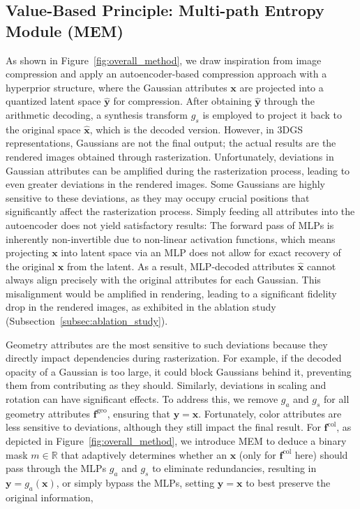 \documentclass{article} %
\begin{document}
\subsection{Value-Based Principle: Multi-path Entropy Module (MEM)}

As shown in Figure~\ref{fig:overall_method}, we draw inspiration from image compression and apply an autoencoder-based compression approach with a hyperprior structure, where the Gaussian attributes $\bm{x}$ are projected into a quantized latent space $\hat{\bm{y}}$ for compression. After obtaining $\hat{\bm{y}}$ through the arithmetic decoding, a synthesis transform $g_s$ is employed to project it back to the original space $\hat{\bm{x}}$, which is the decoded version.
However, in 3DGS representations, Gaussians are not the final output; the actual results are the rendered images obtained through rasterization. Unfortunately, deviations in Gaussian attributes can be amplified during the rasterization process, leading to even greater deviations in the rendered images. Some Gaussians are highly sensitive to these deviations, as they may occupy crucial positions that significantly affect the rasterization process. Simply feeding all attributes into the autoencoder does not yield satisfactory results: 
The forward pass of MLPs is inherently non-invertible due to non-linear activation functions, which means projecting $\bm{x}$ into latent space via an MLP does not allow for exact recovery of the original $\bm{x}$ from the latent. As a result, MLP-decoded attributes $\hat{\bm{x}}$ cannot always align precisely with the original attributes for each Gaussian. This misalignment would be amplified in rendering, leading to a significant fidelity drop in the rendered images, as exhibited in the ablation study (Subsection~\ref{subsec:ablation_study}).

Geometry attributes are the most sensitive to such deviations because they directly impact dependencies during rasterization. For example, if the decoded opacity of a Gaussian is too large, it could block Gaussians behind it, preventing them from contributing as they should. Similarly, deviations in scaling and rotation can have significant effects. To address this, we remove $g_a$ and $g_s$ for all geometry attributes $\bm{f}^{\text{geo}}$, ensuring that $\bm{y}=\bm{x}$.
Fortunately, color attributes are less sensitive to deviations, although they still impact the final result. For $\bm{f}^{\text{col}}$, as depicted in Figure~\ref{fig:overall_method}, we introduce MEM to deduce a binary mask $m\in\mathbb{R}$ that adaptively determines whether an $\bm{x}$ (only for $\bm{f}^{\text{col}}$ here) should pass through the MLPs $g_a$ and $g_s$ to eliminate redundancies, resulting in $\bm{y}=g_a(\bm{x})$, or simply bypass the MLPs, setting $\bm{y}=\bm{x}$ to best preserve the original information,
\end{document}
